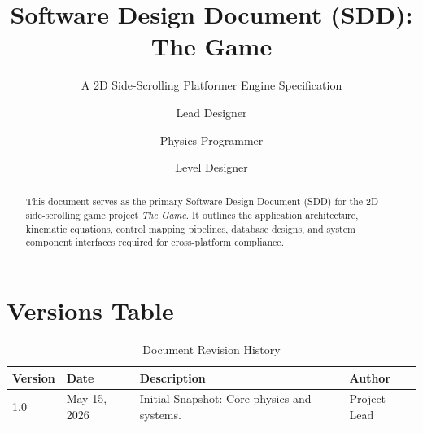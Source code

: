 \documentclass[runningheads]{llncs}
\begin{document}
%
\title{Software Design Document (SDD): The Game}
\subtitle{A 2D Side-Scrolling Platformer Engine Specification}

\author{Lead Designer \and
Physics Programmer \and
Level Designer}



\maketitle              %

\begin{abstract}
This document serves as the primary Software Design Document (SDD) for the 2D side-scrolling game project \textit{The Game}. It outlines the application architecture, kinematic equations, control mapping pipelines, database designs, and system component interfaces required for cross-platform compliance. 

\end{abstract}


\section*{Versions Table}
\begin{table}[h]
\centering
\caption{Document Revision History}
\label{tab:versions}
\begin{tabular}{|p{1.5cm}|p{2.5cm}|p{5.5cm}|p{2.5cm}|}
\hline
\textbf{Version} & \textbf{Date} & \textbf{Description} & \textbf{Author} \\ \hline
1.0 & May 15, 2026 & Initial Snapshot: Core physics and systems. & Project Lead \\ \hline
\end{tabular}
\end{table}
\end{document}

